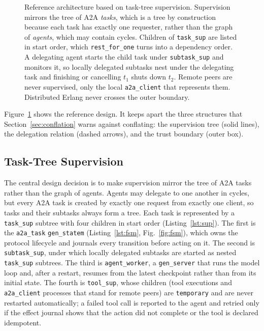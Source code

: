 \documentclass[conference,letterpaper]{IEEEtran}
\newcommand{\code}[1]{\texttt{#1}}
\newcommand{\gs}{\code{gen\_server}}
\newcommand{\gsm}{\code{gen\_statem}}
\begin{document}
\begin{figure}[t]
\caption{Reference architecture based on task-tree supervision. Supervision
mirrors the tree of A2A \emph{tasks}, which is a tree by construction
because each task has exactly one requester, rather than the graph of
\emph{agents}, which may contain cycles. Children of \code{task\_sup} are
listed in start order, which \code{rest\_for\_one} turns into a dependency
order. A delegating agent starts the child task under \code{subtask\_sup} and
monitors it, so locally delegated subtasks nest under the delegating task
and finishing or cancelling $t_1$ shuts down $t_2$. Remote peers are never
supervised, only the local \code{a2a\_client} that represents them.
Distributed Erlang never crosses the outer boundary.}
\label{fig:arch}
\end{figure}

Figure~\ref{fig:arch} shows the reference design. It keeps apart the three
structures that Section~\ref{sec:conflation} warns against conflating: the
supervision tree (solid lines), the delegation relation (dashed arrows), and
the trust boundary (outer box).

\subsection{Task-Tree Supervision}

The central design decision is to make supervision mirror the tree of A2A
tasks rather than the graph of agents. Agents may delegate to one another in
cycles, but every A2A task is created by exactly one request from exactly
one client, so tasks and their subtasks always form a tree. Each task is
represented by a \code{task\_sup} subtree with four children in start order
(Listing~\ref{lst:sup}). The first is the \code{a2a\_task} \gsm{}
(Listing~\ref{lst:fsm}, Fig.~\ref{fig:fsm}), which owns the protocol
lifecycle and journals every transition before acting on it. The second is
\code{subtask\_sup}, under which locally delegated subtasks are started as
nested \code{task\_sup} subtrees. The third is \code{agent\_worker}, a \gs{}
that runs the model loop and, after a restart, resumes from the latest
checkpoint rather than from its initial state. The fourth is
\code{tool\_sup}, whose children (tool executions and \code{a2a\_client}
processes that stand for remote peers) are \code{temporary} and are never
restarted automatically; a failed tool call is reported to the agent and
retried only if the effect journal shows that the action did not complete
or the tool is declared idempotent.
\end{document}
